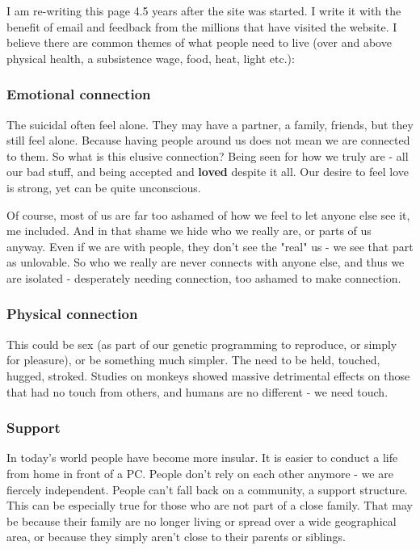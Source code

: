 \documentclass[12pt]{article}
\begin{document}
I am re-writing this page 4.5 years after the site was started. I write it with the benefit of email and feedback from the millions that have visited the website. I believe there are common themes of what people need to live (over and above physical health, a subsistence wage, food, heat, light etc.):

\subsubsection{Emotional connection} The suicidal often feel alone. They may have a partner, a family, friends, but they still feel alone. Because having people around us does not mean we are connected to them. So what is this elusive connection? Being seen for how we truly are - all our bad stuff, and being accepted and \textbf{loved} despite it all. Our desire to feel love is strong, yet can be quite unconscious.

Of course, most of us are far too ashamed of how we feel to let anyone else see it, me included. And in that shame we hide who we really are, or parts of us anyway. Even if we are with people, they don't see the "real" us - we see that part as unlovable. So who we really are never connects with anyone else, and thus we are isolated - desperately needing connection, too ashamed to make connection.

\subsubsection{Physical connection} This could be sex (as part of our genetic programming to reproduce, or simply for pleasure), or be something much simpler. The need to be held, touched, hugged, stroked. Studies on monkeys showed massive detrimental effects on those that had no touch from others, and humans are no different - we need touch.

\subsubsection{Support} In today's world people have become more insular. It is easier to conduct a life from home in front of a PC. People don't rely on each other anymore - we are fiercely independent. People can't fall back on a community, a support structure. This can be especially true for those who are not part of a close family. That may be because their family are no longer living or spread over a wide geographical area, or because they simply aren't close to their parents or siblings.
\end{document}
